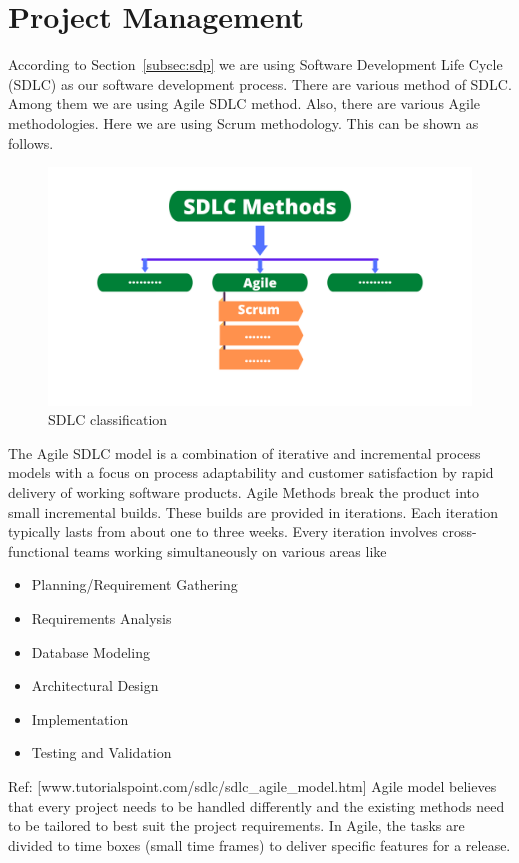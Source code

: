 \section{Project Management}\label{sec:projectmanagement}
According to Section~\ref{subsec:sdp} we are using Software Development Life Cycle (SDLC) as our software development process. There are various method of SDLC. Among them we are using Agile SDLC method. Also, there are various Agile methodologies. Here we are using Scrum methodology. This can be shown as follows.

\begin{figure}[H]
    \centering
    \includegraphics[width=1\textwidth]{images/SDLCMethods}
    \caption{SDLC classification}
    \label{fig:sdlc-class}
\end{figure}

The Agile SDLC model is a combination of iterative and incremental process models with a focus on process adaptability and customer satisfaction by rapid delivery of working software products. Agile Methods break the product into small incremental builds. These builds are provided in iterations. Each iteration typically lasts from about one to three weeks.
Every iteration involves cross-functional teams working simultaneously on various areas like 
\begin{itemize}
\item Planning/Requirement Gathering
\item Requirements Analysis
\item Database Modeling
\item Architectural Design
\item Implementation
\item Testing and Validation
\end{itemize}

Ref: [www.tutorialspoint.com/sdlc/sdlc\_agile\_model.htm]
Agile model believes that every project needs to be handled differently and the existing methods need to be tailored to best suit the project requirements. In Agile, the tasks are divided to time boxes (small time frames) to deliver specific features for a release.\\


